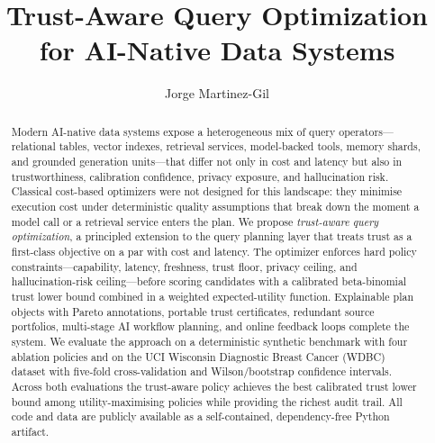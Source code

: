 \documentclass[runningheads]{llncs}
\begin{document}
\title{Trust-Aware Query Optimization\\for AI-Native Data Systems}


\author{Jorge Martinez-Gil}


\maketitle

\begin{abstract}
Modern AI-native data systems expose a heterogeneous mix of query
operators---relational tables, vector indexes, retrieval services,
model-backed tools, memory shards, and grounded generation units---that
differ not only in cost and latency but also in trustworthiness,
calibration confidence, privacy exposure, and hallucination risk.
Classical cost-based optimizers were not designed for this landscape:
they minimise execution cost under deterministic quality assumptions that
break down the moment a model call or a retrieval service enters the plan.
We propose \emph{trust-aware query optimization}, a principled extension
to the query planning layer that treats trust as a first-class objective
on a par with cost and latency.
The optimizer enforces hard policy constraints---capability, latency,
freshness, trust floor, privacy ceiling, and hallucination-risk
ceiling---before scoring candidates with a calibrated beta-binomial
trust lower bound combined in a weighted expected-utility function.
Explainable plan objects with Pareto annotations, portable trust
certificates, redundant source portfolios, multi-stage AI workflow
planning, and online feedback loops complete the system.
We evaluate the approach on a deterministic synthetic benchmark with four
ablation policies and on the UCI Wisconsin Diagnostic Breast Cancer
(WDBC) dataset with five-fold cross-validation and Wilson/bootstrap
confidence intervals.
Across both evaluations the trust-aware policy achieves the best
calibrated trust lower bound among utility-maximising policies while
providing the richest audit trail.
All code and data are publicly available as a self-contained,
dependency-free Python artifact.
\end{abstract}
\end{document}
